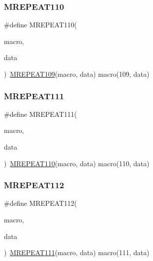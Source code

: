 \mbox{\label{group__group__sam0__utils__mrepeat_ga7ada858a2020e79d348db928bc0b886b}} 
\subsubsection{\texorpdfstring{MREPEAT110}{MREPEAT110}}
{\footnotesize\ttfamily \#define M\+R\+E\+P\+E\+A\+T110(\begin{DoxyParamCaption}\item[{}]{macro,  }\item[{}]{data }\end{DoxyParamCaption})~\mbox{\hyperlink{group__group__sam0__utils__mrepeat_ga3756d19974e9584f0e8f0c6e404c8f61}{M\+R\+E\+P\+E\+A\+T109}}(macro, data)   macro(109, data)}

\mbox{\label{group__group__sam0__utils__mrepeat_gaa95d8fb6f36efe2095bac8dee72ffb69}} 
\subsubsection{\texorpdfstring{MREPEAT111}{MREPEAT111}}
{\footnotesize\ttfamily \#define M\+R\+E\+P\+E\+A\+T111(\begin{DoxyParamCaption}\item[{}]{macro,  }\item[{}]{data }\end{DoxyParamCaption})~\mbox{\hyperlink{group__group__sam0__utils__mrepeat_ga7ada858a2020e79d348db928bc0b886b}{M\+R\+E\+P\+E\+A\+T110}}(macro, data)   macro(110, data)}

\mbox{\label{group__group__sam0__utils__mrepeat_ga9e7619019279e0bb7b52e9825bac227d}} 
\subsubsection{\texorpdfstring{MREPEAT112}{MREPEAT112}}
{\footnotesize\ttfamily \#define M\+R\+E\+P\+E\+A\+T112(\begin{DoxyParamCaption}\item[{}]{macro,  }\item[{}]{data }\end{DoxyParamCaption})~\mbox{\hyperlink{group__group__sam0__utils__mrepeat_gaa95d8fb6f36efe2095bac8dee72ffb69}{M\+R\+E\+P\+E\+A\+T111}}(macro, data)   macro(111, data)}

